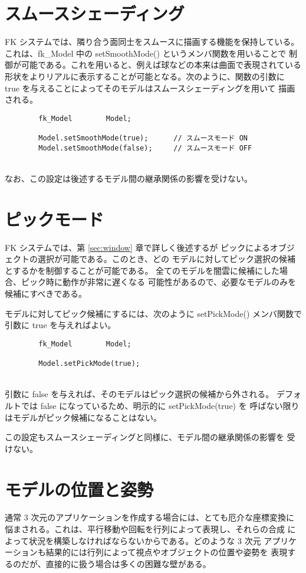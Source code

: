 \section{スムースシェーディング} \label{subsec:smooth}
FK システムでは、隣り合う面同士をスムースに描画する機能を保持している。
これは、fk\_Model 中の setSmoothMode() というメンバ関数を用いることで
制御が可能である。これを用いると、例えば球などの本来は曲面で表現されている
形状をよりリアルに表示することが可能となる。次のように、関数の引数に
true を与えることによってそのモデルはスムースシェーディングを用いて
描画される。
\\
\begin{screen}
\begin{verbatim}
        fk_Model        Model;

        Model.setSmoothMode(true);      // スムースモード ON
        Model.setSmoothMode(false);     // スムースモード OFF
\end{verbatim}
\end{screen}
~ \\
なお、この設定は後述するモデル間の継承関係の影響を受けない。
\section{ピックモード}
FK システムでは、第 \ref{sec:window} 章で詳しく後述するが
ピックによるオブジェクトの選択が可能である。このとき、どの
モデルに対してピック選択の候補とするかを制御することが可能である。
全てのモデルを闇雲に候補にした場合、ピック時に動作が非常に遅くなる
可能性があるので、必要なモデルのみを候補にすべきである。

モデルに対してピック候補にするには、次のように setPickMode() メンバ関数で
引数に true を与えればよい。
\\
\begin{screen}
\begin{verbatim}
        fk_Model        Model;

        Model.setPickMode(true);
\end{verbatim}
\end{screen}
~ \\
引数に false を与えれば、そのモデルはピック選択の候補から外される。
デフォルトでは false になっているため、明示的に setPickMode(true) を
呼ばない限りはモデルがピック候補になることはない。

この設定もスムースシェーディングと同様に、モデル間の継承関係の影響を
受けない。
\section{モデルの位置と姿勢}
通常 3 次元のアプリケーションを作成する場合には、とても厄介な座標変換に
悩まされる。これは、平行移動や回転を行列によって表現し、それらの合成
によって状況を構築しなければならないからである。どのような 3 次元
アプリケーションも結果的には行列によって視点やオブジェクトの位置や姿勢を
表現するのだが、直接的に扱う場合は多くの困難な壁がある。

